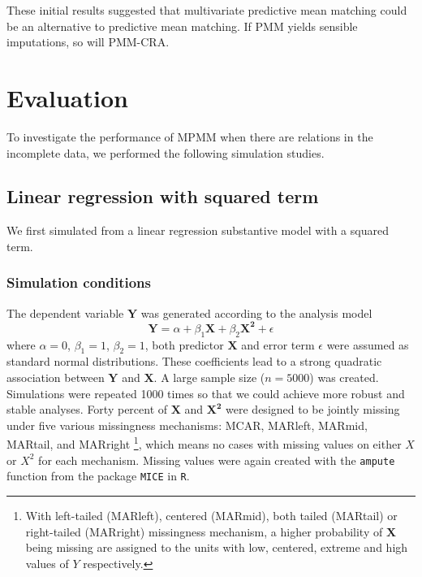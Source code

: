 	These initial results suggested that multivariate predictive mean matching could be an alternative to predictive mean matching. If PMM yields sensible imputations, so will PMM-CRA.
	
	\section{Evaluation}
	\label{sec:3.4}
	To investigate the performance of MPMM when there are relations in the incomplete data, we performed the following simulation studies. 
	
	\subsection{Linear regression with squared term}
	\label{sec:3.4.1}
	We first simulated from a linear regression substantive model with a squared term. 
	\subsubsection{Simulation conditions}
	The dependent variable $\boldsymbol{Y}$ was generated according to the analysis model
	\begin{equation}
		\boldsymbol{Y} = \alpha + \beta_1\boldsymbol{X} + \beta_2 \boldsymbol{X^2} + \epsilon
	\end{equation}
	where $\alpha=0$, $\beta_1=1$, $\beta_2=1$, both predictor $\boldsymbol{X}$ and error term $\epsilon$ were assumed as standard normal distributions. These coefficients lead to a strong quadratic association between $\boldsymbol{Y}$ and $\boldsymbol{X}$. A large sample size ($n=5000$) was created. Simulations were repeated 1000 times so that we could achieve more robust and stable analyses. Forty percent of $\boldsymbol{X}$ and $\boldsymbol{X^2}$ were designed to be jointly missing under five various missingness mechanisms: MCAR, MARleft, MARmid, MARtail, and MARright \footnote[1]{With left-tailed (MARleft), centered (MARmid), both tailed (MARtail) or right-tailed (MARright) missingness mechanism, a higher probability of $\boldsymbol{X}$ being missing are assigned to the units with low, centered, extreme and high values of $Y$ respectively.}, which means no cases with missing values on either $X$ or $X^2$ for each mechanism. Missing values were again created with the \texttt{ampute} function from the package \texttt{MICE} in \texttt{R}.
	
